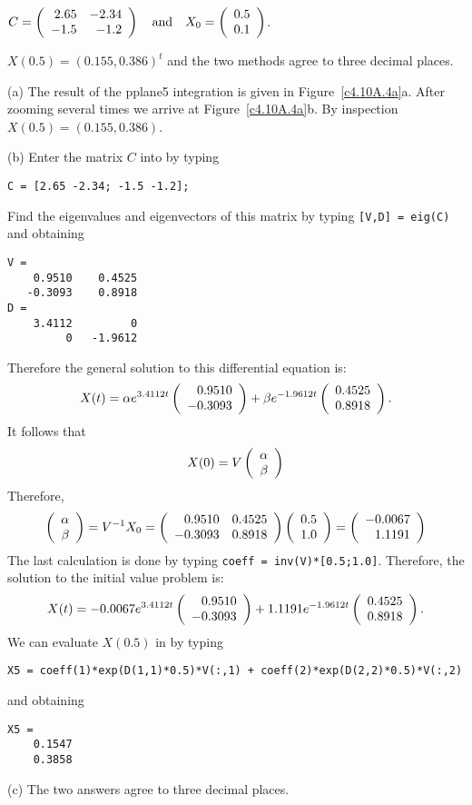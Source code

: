 \documentclass{ximera}
\begin{document}
\begin{computerExercise}  \label{c4.10A.4a}  
$C = \left(\begin{array}{rr} 2.65 & -2.34\\ -1.5 &-1.2\end{array}\right) \quad\mbox{and}\quad X_0=\left(\begin{array}{r} 0.5 \\ 0.1\end{array}\right)$.

\begin{solution}
\ans $X(0.5) = (0.155,0.386)^t$ and the two methods agree to three 
decimal places.

\soln (a) The result of the {\sf pplane5} integration is given in 
Figure~\ref{c4.10A.4a}a. After zooming several times we arrive at
Figure~\ref{c4.10A.4a}b.  By inspection $X(0.5)=(0.155,0.386)$.

(b)  Enter the matrix $C$ into \Matlab by typing
\begin{verbatim}
C = [2.65 -2.34; -1.5 -1.2];
\end{verbatim}
Find the eigenvalues and eigenvectors of this matrix by typing {\tt [V,D] = eig(C)}
and obtaining
\begin{verbatim}
V =
    0.9510    0.4525
   -0.3093    0.8918
D =
    3.4112         0
         0   -1.9612
\end{verbatim}
Therefore the general solution to this differential equation is:
\[
X(t) = \alpha e^{3.4112 t}\left(\begin{array}{r} 0.9510 \\ -0.3093\end{array}\right) +
\beta e^{-1.9612 t}\left(\begin{array}{r} 0.4525 \\ 0.8918\end{array}\right).
\]
It follows that 
\[
X(0) = V \left(\begin{array}{r} \alpha \\ \beta\end{array}\right)
\]
Therefore,
\[
\left(\begin{array}{r} \alpha \\ \beta\end{array}\right) = V^{-1} X_0 = 
\left(\begin{array}{rr} 0.9510 & 0.4525\\ -0.3093 &0.8918\end{array}\right)\left(\begin{array}{r} 0.5 \\ 1.0\end{array}\right) = \left(\begin{array}{r} -0.0067 \\ 1.1191\end{array}\right)
\]
The last calculation is done by typing {\tt coeff = inv(V)*[0.5;1.0]}. 
Therefore, the solution to the initial value problem is:
\[
X(t) = -0.0067e^{3.4112 t}\left(\begin{array}{r} 0.9510 \\ -0.3093\end{array}\right) +
1.1191e^{-1.9612 t}\left(\begin{array}{r} 0.4525 \\ 0.8918\end{array}\right).
\]
We can evaluate $X(0.5)$ in \Matlab by typing
\begin{verbatim}
X5 = coeff(1)*exp(D(1,1)*0.5)*V(:,1) + coeff(2)*exp(D(2,2)*0.5)*V(:,2)
\end{verbatim}
and obtaining
\begin{verbatim}
X5 =
    0.1547
    0.3858
\end{verbatim}


(c)  The two answers agree to three decimal places.

\begin{figure}[htb]
                       \centerline{%
                       }
\end{figure}



\end{solution}
\end{computerExercise}
\end{document}
